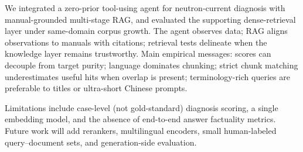 We integrated a zero-prior tool-using agent for neutron-current diagnosis with manual-grounded multi-stage RAG, and evaluated the supporting dense-retrieval layer under same-domain corpus growth.
The agent observes data; RAG aligns observations to manuals with citations; retrieval tests delineate when the knowledge layer remains trustworthy.
Main empirical messages: scores can decouple from target purity; language dominates chunking; strict chunk matching underestimates useful hits when overlap is present; terminology-rich queries are preferable to titles or ultra-short Chinese prompts.

Limitations include case-level (not gold-standard) diagnosis scoring, a single embedding model, and the absence of end-to-end answer factuality metrics.
Future work will add rerankers, multilingual encoders, small human-labeled query--document sets, and generation-side evaluation.
